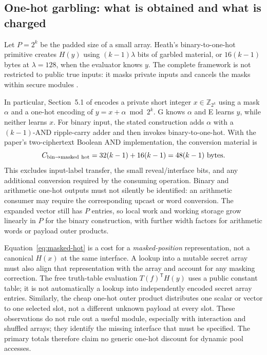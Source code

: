 \subsection{One-hot garbling: what is obtained and what is charged}
Let $P=2^k$ be the padded size of a small array.  Heath's binary-to-one-hot
primitive creates $H(y)$ using $(k-1)\lambda$ bits of garbled material, or
$16(k-1)$ bytes at $\lambda=128$, when the evaluator knows $y$.
The complete framework is not restricted to public true inputs: it masks
private inputs and cancels the masks within secure modules
\cite{heath2021,heath2024}.

In particular, Section~5.1 of \cite{heath2024} encodes a private short integer
$x\in\mathbb Z_{2^k}$ using a mask $\alpha$ and a one-hot encoding of
$y=x+\alpha\bmod 2^k$.  G knows $\alpha$ and E learns $y$, while neither learns
$x$.  For binary input, the stated construction adds $\alpha$ with a
$(k-1)$-AND ripple-carry adder and then invokes binary-to-one-hot.  With the
paper's two-ciphertext Boolean AND implementation, the conversion material is
\begin{equation}
 C_{\rm bin\to masked\ hot}
 =32(k-1)+16(k-1)=48(k-1)\ \text{bytes}.
 \label{eq:masked-hot}
\end{equation}
This excludes input-label transfer, the small reveal/interface bits, and any
additional conversion required by the consuming operation.  Binary and
arithmetic one-hot outputs must not silently be identified: an arithmetic
consumer may require the corresponding upcast or word conversion.  The
expanded vector still has $P$ entries, so local work and working storage grow
linearly in $P$ for the binary construction, with further width factors for
arithmetic words or payload outer products.

Equation~\eqref{eq:masked-hot} is a cost for a \emph{masked-position}
representation, not a canonical $H(x)$ at the same interface.  A lookup into
a mutable secret array must also align that representation with the array
and account for any masking correction.  The free truth-table evaluation
$T(f)^\mathsf{T}H(y)$ uses a public constant table; it is not automatically a
lookup into independently encoded secret array entries.  Similarly, the cheap
one-hot outer product distributes one scalar or vector to one selected slot,
not a different unknown payload at every slot.  These observations do not
rule out a useful module, especially with interaction and shuffled arrays;
they identify the missing interface that must be specified.  The primary
totals therefore claim no generic one-hot discount for dynamic pool accesses.

